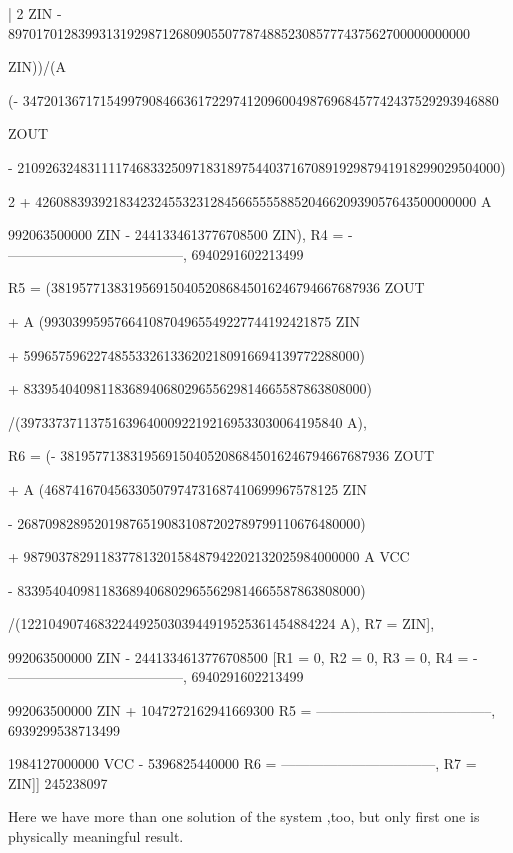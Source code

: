 \begin{literatim}{|}
    2
 ZIN  - 897017012839931319298712680905507787488523085777437562700000000000

 ZIN))/(A

 (- 34720136717154997908466361722974120960049876968457742437529293946880

 ZOUT

 - 210926324831111746833250971831897544037167089192987941918299029504000)

                                                                    2
 + 426088393921834232455323128456655558852046620939057643500000000 A

              992063500000 ZIN - 2441334613776708500
 ZIN), R4 = - --------------------------------------, 
                         6940291602213499

R5 = (38195771383195691504052086845016246794667687936 ZOUT

 + A (99303995957664108704965549227744192421875 ZIN

 + 599657596227485533261336202180916694139772288000)

 + 8339540409811836894068029655629814665587863808000)

/(3973373711375163964000922192169533030064195840 A), 

R6 = (- 38195771383195691504052086845016246794667687936 ZOUT

 + A (468741670456330507974731687410699967578125 ZIN

 - 2687098289520198765190831087202789799110676480000)

 + 987903782911837781320158487942202132025984000000 A VCC

 - 8339540409811836894068029655629814665587863808000)

/(122104907468322449250303944919525361454884224 A), R7 = ZIN], 

                                992063500000 ZIN - 2441334613776708500
[R1 = 0, R2 = 0, R3 = 0, R4 = - --------------------------------------, 
                                           6940291602213499

     992063500000 ZIN + 1047272162941669300
R5 = --------------------------------------, 
                6939299538713499

     1984127000000 VCC - 5396825440000
R6 = ---------------------------------, R7 = ZIN]]
                 245238097
\end{literatim}
Here we have more than one solution of the system ,too, but only first one is
physically meaningful result.

